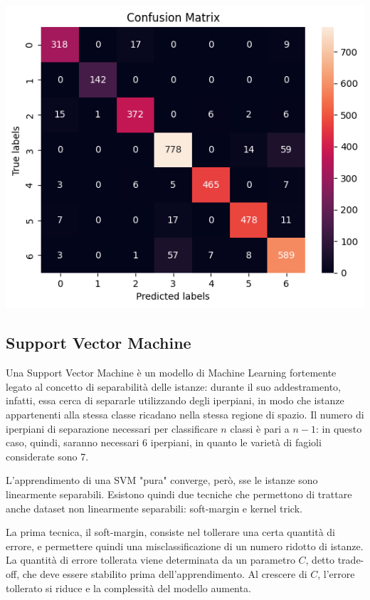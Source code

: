 \begin{Figure}
    \centering
    \includegraphics[width=\linewidth]{img/mlp_high_confusion_matrix.png}
\end{Figure}

\subsection{Support Vector Machine}
Una Support Vector Machine è un modello di Machine Learning fortemente legato
al concetto di separabilità delle istanze: durante il suo addestramento, infatti,
essa cerca di separarle utilizzando degli iperpiani, in modo che istanze
appartenenti alla stessa classe ricadano nella stessa regione di spazio. 
Il numero di iperpiani di separazione necessari per classificare $n$ classi
è pari a $n-1$: in questo caso, quindi, saranno necessari 6 iperpiani, in quanto
le varietà di fagioli considerate sono 7.

L'apprendimento di una SVM "pura" converge, però, sse le istanze
sono linearmente separabili.
Esistono quindi due tecniche che permettono di trattare anche dataset non linearmente
separabili: soft-margin e kernel trick.

La prima tecnica, il soft-margin, consiste nel tollerare una certa quantità di
errore, e permettere quindi una misclassificazione di un numero ridotto di
istanze. La quantità di errore tollerata viene determinata da un parametro $C$,
detto trade-off, che deve essere stabilito prima dell'apprendimento.
Al crescere di $C$, l'errore tollerato si riduce e la complessità del modello
aumenta.

